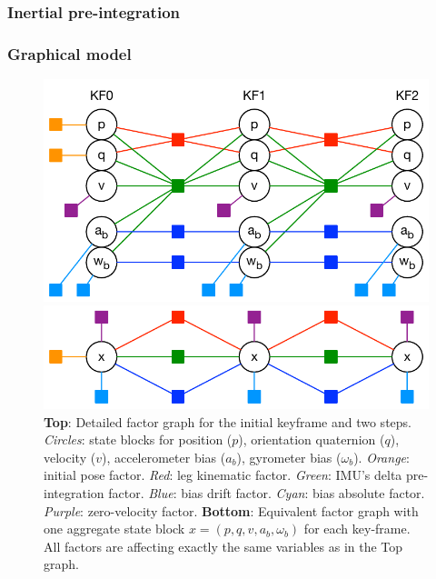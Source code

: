 \subsubsection{Inertial pre-integration}
\subsubsection{Graphical model}

\begin{figure}[tb]
\begin{center}
\includegraphics[scale=0.65]{figures/graph_exploded}
\par\vspace{4mm}
\includegraphics[scale=0.65]{figures/graph_essential}
\caption{
{\bf Top}: Detailed factor graph for the initial keyframe and two steps. \emph{Circles}: state blocks for position ($p$), orientation quaternion ($q$), velocity ($v$), accelerometer bias ($a_b$), gyrometer bias ($\omega_b$). \emph{Orange}: initial pose factor. \emph{Red}: leg kinematic factor. \emph{Green}: IMU's delta pre-integration factor. 
\emph{Blue}: bias drift factor. \emph{Cyan}: bias absolute factor. \emph{Purple}: zero-velocity factor. 
{\bf Bottom}: Equivalent factor graph with one aggregate state block $x=(p,q,v,a_b,\omega_b)$ for each key-frame. All factors are affecting exactly the same variables as in the Top graph.
}
\label{default}
\end{center}
\end{figure}


